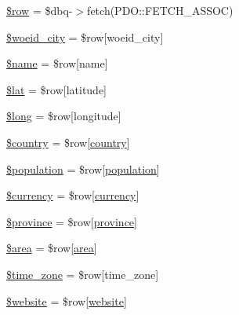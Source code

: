 \begin{DoxyCompactItemize}
\mbox{\hyperlink{rotterdam_2index_8php_aa1d731aa570613e5bcff831bb10e9b87}{\$row}} = \$dbq-\/$>$fetch(P\+D\+O\+::\+F\+E\+T\+C\+H\+\_\+\+A\+S\+S\+OC)
\item 
\mbox{\hyperlink{rotterdam_2index_8php_a34dc977e0c4838f8c2d423849ad9ff02}{\$woeid\+\_\+city}} = \$row\mbox{[}\textquotesingle{}woeid\+\_\+city\textquotesingle{}\mbox{]}
\item 
\mbox{\hyperlink{rotterdam_2index_8php_ab2fc40d43824ea3e1ce5d86dee0d763b}{\$name}} = \$row\mbox{[}\textquotesingle{}name\textquotesingle{}\mbox{]}
\item 
\mbox{\hyperlink{rotterdam_2index_8php_af498b42b83afed4dfe0af05fd802776c}{\$lat}} = \$row\mbox{[}\textquotesingle{}latitude\textquotesingle{}\mbox{]}
\item 
\mbox{\hyperlink{rotterdam_2index_8php_a30223182013e2964ccbd7c134b3c52c1}{\$long}} = \$row\mbox{[}\textquotesingle{}longitude\textquotesingle{}\mbox{]}
\item 
\mbox{\hyperlink{rotterdam_2index_8php_a1437a5f6eb157f0eb267a26e0ad4f1ba}{\$country}} = \$row\mbox{[}\textquotesingle{}\mbox{\hyperlink{index_8php_a0f0752705301c982dc8994ebc993e6e9}{country}}\textquotesingle{}\mbox{]}
\item 
\mbox{\hyperlink{rotterdam_2index_8php_afc1939ed7d0e8629546e2bc27b02dbc1}{\$population}} = \$row\mbox{[}\textquotesingle{}\mbox{\hyperlink{index_8php_aa78fa356925cd3f67d485c4d6846202b}{population}}\textquotesingle{}\mbox{]}
\item 
\mbox{\hyperlink{rotterdam_2index_8php_a37d22fd3b896e9d5488f3479a4d8f451}{\$currency}} = \$row\mbox{[}\textquotesingle{}\mbox{\hyperlink{index_8php_abd84e0698c321abdbf211d5b8425d0b5}{currency}}\textquotesingle{}\mbox{]}
\item 
\mbox{\hyperlink{rotterdam_2index_8php_a0bdd006d1becad76055fe31c887fdfaf}{\$province}} = \$row\mbox{[}\textquotesingle{}\mbox{\hyperlink{index_8php_a38d70414c65575df5643ad4296c9db2e}{province}}\textquotesingle{}\mbox{]}
\item 
\mbox{\hyperlink{rotterdam_2index_8php_a460a08379d150f8c151a07ad9a3251cd}{\$area}} = \$row\mbox{[}\textquotesingle{}\mbox{\hyperlink{index_8php_a5198216176428aa2303311f956213f33}{area}}\textquotesingle{}\mbox{]}
\item 
\mbox{\hyperlink{rotterdam_2index_8php_adce4610b55a895abff73b5ed259c4bd3}{\$time\+\_\+zone}} = \$row\mbox{[}\textquotesingle{}time\+\_\+zone\textquotesingle{}\mbox{]}
\item 
\mbox{\hyperlink{rotterdam_2index_8php_a2887d41d3bb2498db735eeb87efa2d73}{\$website}} = \$row\mbox{[}\textquotesingle{}\mbox{\hyperlink{index_8php_a8c56014cff17c1ced653aa98455da680}{website}}\textquotesingle{}\mbox{]}

\end{DoxyCompactItemize}
